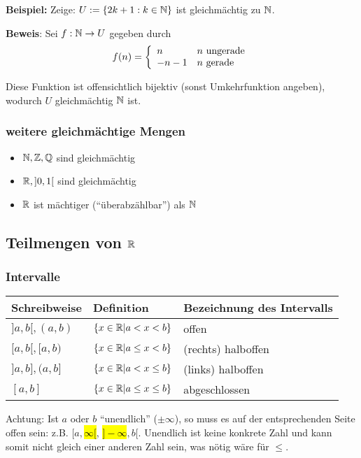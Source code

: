 \textbf{Beispiel:}
Zeige: $U := \{ 2k + 1: k \in \mathbb{N} \}$ ist gleichmächtig zu $\mathbb{N}$.

\textbf{Beweis}: Sei $f: \mathbb{N} \rightarrow U$ gegeben durch
\begin{equation*}
f(n) = \left\{
	\begin{array}{l l}
		n & n \text{ ungerade}\\
		-n - 1 & n \text{ gerade}
	\end{array}
\right.
\end{equation*}

Diese Funktion ist offensichtlich bijektiv (sonst Umkehrfunktion angeben), wodurch $U$ gleichmächtig $\mathbb{N}$ ist.

\subsubsection[Gleichmächtige Mengen]{weitere gleichmächtige Mengen}
\begin{itemize}
	\item $\mathbb{N}, \mathbb{Z}, \mathbb{Q}$ sind gleichmächtig
	\item $\mathbb{R}, ]0,1[$ sind gleichmächtig
	\item $\mathbb{R}$ ist mächtiger (``überabzählbar'') als $\mathbb{N}$
\end{itemize}

\subsection{Teilmengen von $\mathbb{R}$}
\subsubsection{Intervalle}
\begin{tabular}{|l|l|l|}\hline
Schreibweise & Definition & Bezeichnung des Intervalls\\\hline
$]a, b[, (a,b)$ & $\{x \in \mathbb{R} | a < x < b\}$ & offen\\\hline
$[a, b[, [a, b)$ & $\{x \in \mathbb{R} | a \leq x < b\}$ & (rechts) halboffen \\\hline
$]a,b], (a, b]$ & $\{x \in \mathbb{R} | a < x \leq b\}$ & (links) halboffen \\\hline
$[a,b]$ & $\{x \in \mathbb{R} | a \leq x \leq b\}$ & abgeschlossen \\\hline
\end{tabular}

Achtung: Ist $a$ oder $b$ ``unendlich'' ($\pm \infty$), so muss es auf der entsprechenden Seite offen sein: z.B. $[a, $\hl{$\infty[$}, \hl{$]-\infty$}$, b[$.
Unendlich ist keine konkrete Zahl und kann somit nicht gleich einer anderen Zahl sein, was nötig wäre für $\leq$.
\pagebreak

